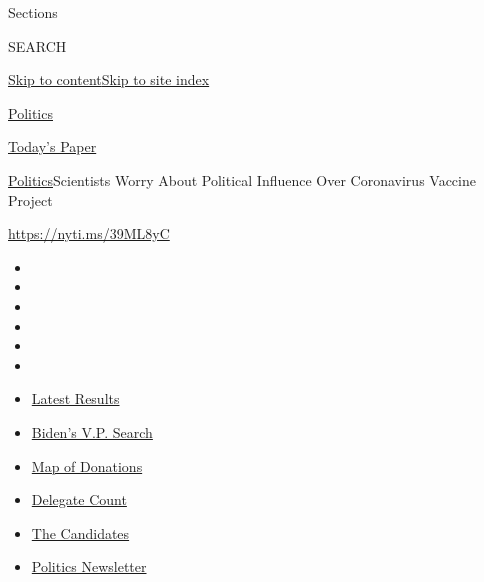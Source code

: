 Sections

SEARCH

\protect\hyperlink{site-content}{Skip to
content}\protect\hyperlink{site-index}{Skip to site index}

\href{https://www.nytimes.com/section/politics}{Politics}

\href{https://myaccount.nytimes.com/auth/login?response_type=cookie\&client_id=vi}{}

\href{https://www.nytimes.com/section/todayspaper}{Today's Paper}

\href{/section/politics}{Politics}\textbar{}Scientists Worry About
Political Influence Over Coronavirus Vaccine Project

\url{https://nyti.ms/39ML8yC}

\begin{itemize}
\item
\item
\item
\item
\item
\item
\end{itemize}

\begin{itemize}
\item
  \href{https://www.nytimes.com/interactive/2020/08/04/us/elections/results-arizona-kansas-michigan-missouri-primaries.html?action=click\&pgtype=Article\&state=default\&region=TOP_BANNER\&context=storylines_menu}{Latest
  Results}
\item
  \href{https://www.nytimes.com/article/biden-vice-president-2020.html?action=click\&pgtype=Article\&state=default\&region=TOP_BANNER\&context=storylines_menu}{Biden's
  V.P. Search}
\item
  \href{https://www.nytimes.com/interactive/2020/07/24/us/politics/trump-biden-campaign-donors.html?action=click\&pgtype=Article\&state=default\&region=TOP_BANNER\&context=storylines_menu}{Map
  of Donations}
\item
  \href{https://www.nytimes.com/interactive/2020/us/elections/delegate-count-primary-results.html?action=click\&pgtype=Article\&state=default\&region=TOP_BANNER\&context=storylines_menu}{Delegate
  Count}
\item
  \href{https://www.nytimes.com/interactive/2019/us/politics/2020-presidential-candidates.html?action=click\&pgtype=Article\&state=default\&region=TOP_BANNER\&context=storylines_menu}{The
  Candidates}
\item
  \href{https://www.nytimes.com/newsletters/politics?action=click\&pgtype=Article\&state=default\&region=TOP_BANNER\&context=storylines_menu}{Politics
  Newsletter}
\end{itemize}

